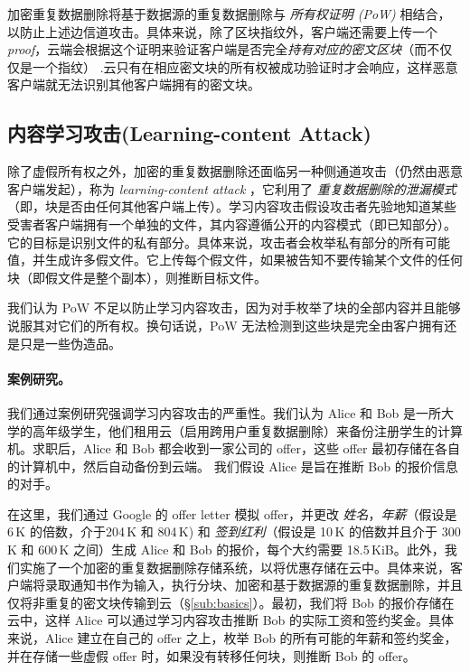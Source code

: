 加密重复数据删除将基于数据源的重复数据删除与 {\em 所有权证明 (PoW)} \cite{halevi11} 相结合，以防止上述边信道攻击。具体来说，除了区块指纹外，客户端还需要上传一个{\em proof}，云端会根据这个证明来验证客户端是否完全{\em 持有对应的密文区块}（而不仅仅是一个指纹） .云只有在相应密文块的所有权被成功验证时才会响应，这样恶意客户端就无法识别其他客户端拥有的密文块。

\subsection{内容学习攻击(Learning-content Attack)}
\label{sub:attack}
除了虚假所有权之外，加密的重复数据删除还面临另一种侧通道攻击（仍然由恶意客户端发起），称为 {\em learning-content attack} \cite{harnik10, zuo18}，它利用了 {\em 重复数据删除的泄漏模式}（即，块是否由任何其他客户端上传）。学习内容攻击假设攻击者先验地知道某些受害者客户端拥有一个单独的文件，其内容遵循公开的内容模式（即已知部分）。它的目标是识别文件的私有部分。具体来说，攻击者会枚举私有部分的所有可能值，并生成许多假文件。它上传每个假文件，如果被告知不要传输某个文件的任何块（即假文件是整个副本），则推断目标文件。

我们认为 PoW \cite{halevi11} 不足以防止学习内容攻击，因为对手枚举了块的全部内容并且能够说服其对它们的所有权。换句话说，PoW 无法检测到这些块是完全由客户拥有还是只是一些伪造品。

\paragraph{案例研究。}
我们通过案例研究强调学习内容攻击的严重性。我们认为 Alice 和 Bob 是一所大学的高年级学生，他们租用云（启用跨用户重复数据删除）来备份注册学生的计算机。求职后，Alice 和 Bob 都会收到一家公司的 offer，这些 offer 最初存储在各自的计算机中，然后自动备份到云端。
我们假设 Alice 是旨在推断 Bob 的报价信息的对手。


在这里，我们通过 Google 的 offer letter \cite{google_offer} 模拟 offer，并更改 \textit{姓名}，\textit{年薪}（假设是 6\,K \cite{harnik10} 的倍数，介于204\,K 和 804\,K) 和 \textit{签到红利}（假设是 10\,K 的倍数并且介于 300\,K 和 600\,K 之间）生成 Alice 和 Bob 的报价，每个大约需要 18.5\,KiB。此外，我们实施了一个加密的重复数据删除存储系统，以将优惠存储在云中。具体来说，客户端将录取通知书作为输入，执行分块、加密和基于数据源的重复数据删除，并且仅将非重复的密文块传输到云（\S\ref{sub:basics}）。最初，我们将 Bob 的报价存储在云中，这样 Alice 可以通过学习内容攻击推断 Bob 的实际工资和签约奖金。具体来说，Alice 建立在自己的 offer 之上，枚举 Bob 的所有可能的年薪和签约奖金，并在存储一些虚假 offer 时，如果没有转移任何块，则推断 Bob 的 offer。


